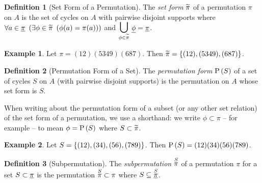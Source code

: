 \documentclass[a4paper,twoside,12pt,openany]{report}
\theoremstyle{plain}
\theoremstyle{definition}
\newtheorem{definition}{Definition}
\newtheorem{example}{Example}
\theoremstyle{remark}
\begin{document}
\begin{definition}[Set Form of a Permutation]
	The \emph{set form} \(\widetilde{\pi}\) of a permutation \(\pi\) on \(A\) is the set of cycles on \(A\) with 
	pairwise disjoint supports where
	\(\forall a\in\underline{\pi}\ \left(\exists \phi\in\widetilde{\pi}\ \left(\phi(a)=\pi(a)\right)\right)\) 
	and \(\underset{\phi\in\setform\pi}{\bbigcup}\ \phiset = \piset\).
\end{definition}

\begin{example}
	Let \(\pi = (12)(5349)(687)\). Then \(\widetilde{\pi} = \left\{ (12),(5349),(687) \right\}\).
\end{example}


\begin{definition}[Permutation Form of a Set]
	The \emph{permutation form} \(\mathrm{P}\left(S\right)\) of a set of cycles \(S\) on \(A\) (with pairwise disjoint supports) is the permutation on \(A\) whose set form is \(S\).
\end{definition}

When writing about the permutation form of a subset (or any other set relation) of the set form of a permutation, we use a shorthand: 
we write \(\phi\subset\pi\) -- for example -- to mean \(\phi=\mathrm{P}\left(S\right)\) where \(S\subset\widetilde{\pi}\).

\begin{example}
	Let \(S = \left\{ (12),(34),(56),(789) \right\}\). Then \(\mathrm{P}\left(S\right) = (12)(34)(56)(789)\).
\end{example}

\begin{definition}[Subpermutation]
	The \emph{subpermutation} \(\overset{S}{\pi}\) of a permutation \(\pi\) for a set \(S\subset\underline{\pi}\) is the permutation \(\overset{S}{\pi}\subset\pi\) where \(S \subseteq \underline{\overset{S}{\pi}}\).
\end{definition}
\end{document}
